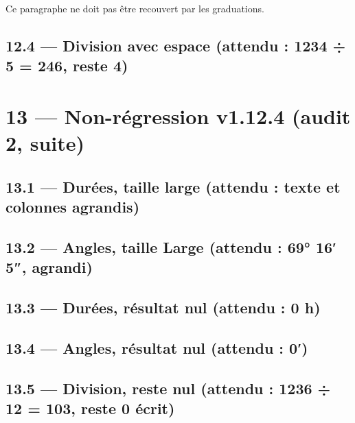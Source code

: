\documentclass[12pt]{extarticle}
\begin{document}
\reperegradue[bg={(0,0)}, hd={(4,2)}]
Ce paragraphe ne doit pas être recouvert par les graduations.

\subsection*{12.4 — Division avec espace (attendu : 1234 ÷ 5 = 246, reste 4)}

\division[dividende=1 234, diviseur=5, solution]

\section*{13 — Non-régression v1.12.4 (audit 2, suite)}

\subsection*{13.1 — Durées, taille large (attendu : texte et colonnes agrandis)}


\subsection*{13.2 — Angles, taille Large (attendu : 69° 16′ 5″, agrandi)}


\subsection*{13.3 — Durées, résultat nul (attendu : 0 h)}


\subsection*{13.4 — Angles, résultat nul (attendu : 0′)}


\subsection*{13.5 — Division, reste nul (attendu : 1236 ÷ 12 = 103, reste 0 écrit)}
\end{document}
